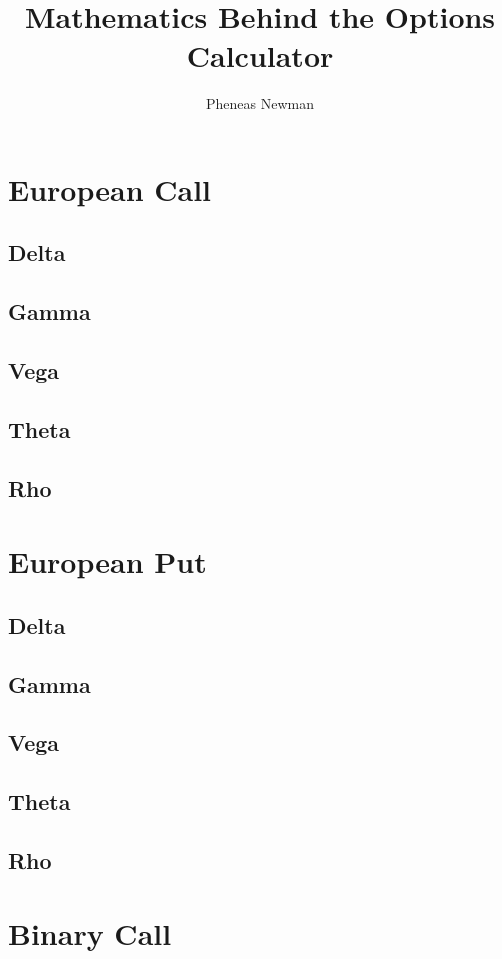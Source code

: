 \documentclass[12pt,a4paper]{article}
\begin{document}
\title{Mathematics Behind the Options Calculator}
\author{Pheneas Newman}
\maketitle

\section{European Call}

\subsection{Delta}
\subsection{Gamma}
\subsection{Vega}
\subsection{Theta}
\subsection{Rho}

\section{European Put}
\subsection{Delta}
\subsection{Gamma}
\subsection{Vega}
\subsection{Theta}
\subsection{Rho}

\section{Binary Call}
\end{document}
